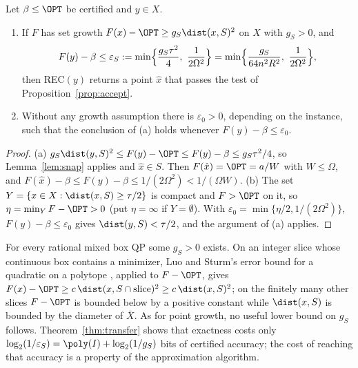 \begin{theorem}\label{thm:transfer}
Let $\beta\le\OPT$ be certified and $y\in X$.
\begin{enumerate}[label=(\alph*)]
\item If $F$ has set growth $F(x)-\OPT\ge g_S\dist(x,S)^2$ on $X$ with
$g_S>0$, and
\begin{equation}\label{eq:transfer-threshold}
F(y)-\beta\le\varepsilon_S:=\min\Bigl\{\frac{g_S\tau^2}{4},\
\frac1{2\Omega^2}\Bigr\}
=\min\Bigl\{\frac{g_S}{64n^2R^2},\ \frac1{2\Omega^2}\Bigr\},
\end{equation}
then REC$(y)$ returns a point $\hat x$ that passes the test of
Proposition~\ref{prop:accept}.
\item Without any growth assumption there is $\varepsilon_0>0$, depending on
the instance, such that the conclusion of (a) holds whenever
$F(y)-\beta\le\varepsilon_0$.
\end{enumerate}
\end{theorem}

\begin{proof}
(a) $g_S\dist(y,S)^2\le F(y)-\OPT\le F(y)-\beta\le g_S\tau^2/4$, so
Lemma~\ref{lem:snap} applies and $\hat x\in S$. Then
$F(\hat x)=\OPT=a/W$ with $W\le \Omega$, and
$F(\hat x)-\beta\le F(y)-\beta\le1/(2\Omega^2)<1/(\Omega W)$.
(b) The set $Y=\{x\in X:\dist(x,S)\ge\tau/2\}$ is compact and $F>\OPT$ on
it, so $\eta=\min_YF-\OPT>0$ (put $\eta=\infty$ if $Y=\emptyset$). With
$\varepsilon_0=\min\{\eta/2,1/(2\Omega^2)\}$, $F(y)-\beta\le\varepsilon_0$ gives
$\dist(y,S)<\tau/2$, and the argument of (a) applies.
\end{proof}

\begin{remark}\label{rem:setgrowth}
For every rational mixed box QP some $g_S>0$ exists. On an integer slice
whose continuous box contains a minimizer, Luo and Sturm's error bound for a
quadratic on a polytope \cite[Theorem~3.3]{LuoSturm2000}, applied to $F-\OPT$,
gives $F(x)-\OPT\ge c\,\dist(x,S\cap\text{slice})^2\ge c\,\dist(x,S)^2$; on
the finitely many other slices $F-\OPT$ is bounded below by a positive
constant while $\dist(x,S)$ is bounded by the diameter of $\bar X$. As for
point growth, no useful lower bound on $g_S$ follows. Theorem~\ref{thm:transfer}
shows that exactness costs only $\log_2(1/\varepsilon_S)
=\poly(I)+\log_2(1/g_S)$ bits of certified accuracy; the cost of reaching that
accuracy is a property of the approximation algorithm.
\end{remark}

